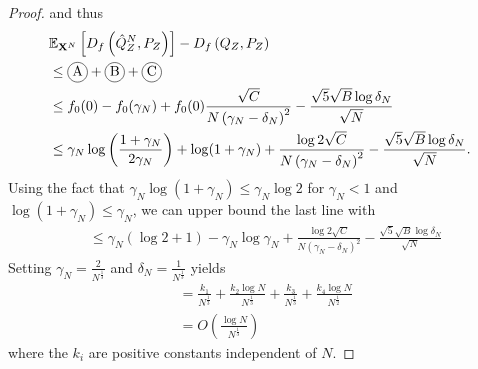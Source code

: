 \begin{proof}
%
and thus
%
\begin{align*}
    &\E_{\XN} \left[ D_f\left( \hat{Q}_Z^N , P_Z\right)\right] - D_f\left( Q_{Z} , P_Z\right)\\
    &\leq \encircle{A} + \encircle{B} + \encircle{C} \\
    &\leq f_0(0) - f_0(\gamma_N) + f_0(0) \frac{\sqrt{C}}{N \left( \gamma_N - \delta_N \right)^2} - \frac{\sqrt{5}\sqrt{B}\log \delta_N}{\sqrt{N}}\\
    &\leq \gamma_N \log\left(\frac{1+\gamma_N}{2\gamma_N}\right) + \log(1+\gamma_N) + \frac{\log2\sqrt{C}}{N \left( \gamma_N - \delta_N \right)^2} - \frac{\sqrt{5}\sqrt{B} \log \delta_N}{\sqrt{N}}. 
\end{align*}
Using the fact that $\gamma_N \log(1+\gamma_N) \leq \gamma_N \log2$ for $\gamma_N < 1$ and $\log(1+ \gamma_N) \leq \gamma_N$, we can upper bound the last line with
\begin{align*}
    &\leq \gamma_N \left(\log2 + 1\right)   - \gamma_N \log \gamma_N  + \frac{\log2\sqrt{C}}{N \left( \gamma_N - \delta_N \right)^2} - \frac{\sqrt{5}\sqrt{B} \log \delta_N}{\sqrt{N}} 
\end{align*}
%
Setting $\gamma_N = \frac{2}{N^\frac{1}{3}}$ and $\delta_N = \frac{1}{N^\frac{1}{3}}$ yields
%
\begin{align*}
    &= \frac{k_1}{N^{\frac{1}{3}}} + \frac{k_2 \log N}{N^{\frac{1}{3}}}
    + \frac{k_3}{N^{\frac{1}{3}}} 
    + \frac{k_4 \log N}{N^{\frac{1}{2}}} \\
    & = O\left(\frac{\log N}{N^\frac{1}{3}} \right)
\end{align*}
where the $k_i$ are positive constants independent of $N$.


\end{proof}
